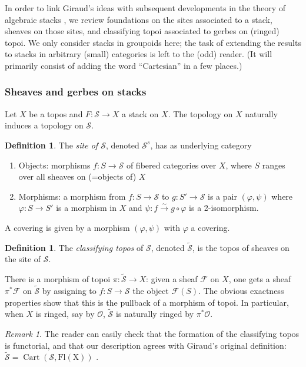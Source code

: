 \documentclass[11pt]{amsart}
\newcommand{\ms}[1]{\mathscr #1}
\newcommand{\simto}{\stackrel{\sim}{\to}}
\renewcommand{\phi}{\varphi}
\renewcommand{\[}{[\!\hspace{0.03em}[}
\renewcommand{\]}{]\!\hspace{0.03em}]}
\renewcommand{\(}{(\!\hspace{0.03em}(}
\renewcommand{\)}{)\!\hspace{0.03em})}
\theoremstyle{definition}
\newtheorem{defn}[lem]{Definition}
\theoremstyle{remark}
\newtheorem{remark}[lem]{Remark}
\newenvironment{rem}{\begin{remark}}{\nolinebreak{\hfill $\blacklozenge$} \end{remark}}
\begin{document}
In order to link Giraud's ideas with subsequent developments in the 
theory of algebraic stacks \cite{l-mb}, we review foundations on the 
sites associated to a stack, sheaves on those sites, and classifying 
topoi associated to gerbes on (ringed) topoi.  We only consider stacks 
in groupoids here; the task of extending the results to 
stacks in arbitrary (small) categories is left to the (odd) reader.  (It 
will primarily consist of adding the word ``Cartesian'' in a few 
places.)

\subsubsection{Sheaves and gerbes on stacks}\label{S:sheaves and gerbes on stacks}
Let $X$ be a topos and $F:\ms S\to X$ a stack on $X$.  The topology 
on $X$ naturally induces a topology on $\ms S$.

\begin{defn} The \emph{site of $\ms S$\/}, denoted $\ms S^{s}$, has as underlying category
    \begin{enumerate}
	\item[] Objects: morphisms $f:S\to\ms S$ of fibered categories over 
	$X$, where $S$ ranges over all sheaves on (=objects of) $X$
	\item[] Morphisms: a morphism from $f:S\to\ms S$ to $g:S'\to\ms S$ is 
	a pair $(\phi,\psi)$ where $\phi:S\to S'$ is a morphism in $X$ and 
	$\psi:f\simto g\circ\phi$ is a 2-isomorphism.
    \end{enumerate}
A covering is given by a morphism $(\phi,\psi)$ with $\phi$ a covering.
\end{defn}

\begin{defn} The \emph{classifying topos\/} of $\ms S$, denoted 
$\widetilde{\ms S}$, is the topos of sheaves on the site of $\ms S$.
\end{defn}

There is a morphism of topoi $\pi:\widetilde{\ms S}\to X$: 
given a sheaf $\ms F$ on $X$, one gets a sheaf $\pi^{\ast}\ms F$ on 
$\widetilde{\ms S}$ by assigning to $f:S\to \ms S$ the object $\ms 
F(S)$.  
The obvious exactness properties show that this is the pullback of a 
morphism of topoi.  In particular, when $X$ is ringed, say by $\ms 
O$, $\widetilde{\ms S}$ is naturally ringed by $\pi^{\ast}\ms O$.  

\begin{rem}\label{R:we agree with Giraud} The reader can easily check that 
the formation of the classifying 
topos is functorial, and that our description agrees with Giraud's 
original definition:
$\widetilde{\ms S}=\operatorname{Cart}(\ms 
S,\operatorname{Fl(X)})$ \cite[\S5.1]{giraud}.
\end{rem}
\end{document}
